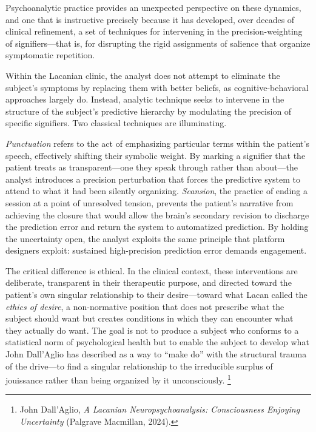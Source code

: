 \documentclass[12pt,a4paper]{article}
\begin{document}
Psychoanalytic practice provides an unexpected perspective on these dynamics, and one that is
instructive precisely because it has developed, over decades of clinical refinement, a set of
techniques for intervening in the precision-weighting of signifiers---that is, for disrupting
the rigid assignments of salience that organize symptomatic repetition.

Within the Lacanian clinic, the analyst does not attempt to eliminate the subject's symptoms
by replacing them with better beliefs, as cognitive-behavioral approaches largely do. Instead,
analytic technique seeks to intervene in the structure of the subject's predictive hierarchy by
modulating the precision of specific signifiers. Two classical techniques are illuminating.

\emph{Punctuation} refers to the act of emphasizing particular terms within the patient's
speech, effectively shifting their symbolic weight. By marking a signifier that the patient
treats as transparent---one they speak through rather than about---the analyst introduces a
precision perturbation that forces the predictive system to attend to what it had been silently
organizing. \emph{Scansion}, the practice of ending a session at a point of unresolved tension,
prevents the patient's narrative from achieving the closure that would allow the brain's
secondary revision to discharge the prediction error and return the system to automatized
prediction. By holding the uncertainty open, the analyst exploits the same principle that
platform designers exploit: sustained high-precision prediction error demands engagement.

The critical difference is ethical. In the clinical context, these interventions are deliberate,
transparent in their therapeutic purpose, and directed toward the patient's own singular
relationship to their desire---toward what Lacan called the \emph{ethics of desire}, a
non-normative position that does not prescribe what the subject should want but creates conditions
in which they can encounter what they actually do want. The goal is not to produce a subject who
conforms to a statistical norm of psychological health but to enable the subject to develop what
John Dall'Aglio has described as a way to ``make do'' with the structural trauma of the
drive---to find a singular relationship to the irreducible surplus of jouissance rather than
being organized by it unconsciously.%
\footnote{John Dall'Aglio, \emph{A Lacanian Neuropsychoanalysis: Consciousness Enjoying
Uncertainty} (Palgrave Macmillan, 2024).}
\end{document}
